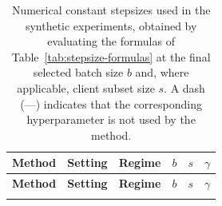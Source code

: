 \documentclass{article}
\theoremstyle{plain}
\begin{document}
\begin{longtable}{lllccc}
\caption{Numerical constant stepsizes used in the synthetic experiments, obtained by evaluating the formulas of Table~\ref{tab:stepsize-formulas} at the final selected batch size $b$ and, where applicable, client subset size $s$. A dash (---) indicates that the corresponding hyperparameter is not used by the method.}
\label{tab:stepsize-values}\\
\toprule
\textbf{Method} & \textbf{Setting} & \textbf{Regime} & $b$ & $s$ & $\gamma$ \\
\midrule
\endfirsthead

\toprule
\textbf{Method} & \textbf{Setting} & \textbf{Regime} & $b$ & $s$ & $\gamma$ \\
\midrule
\endhead

\bottomrule
\endfoot


\end{longtable}
\end{document}

